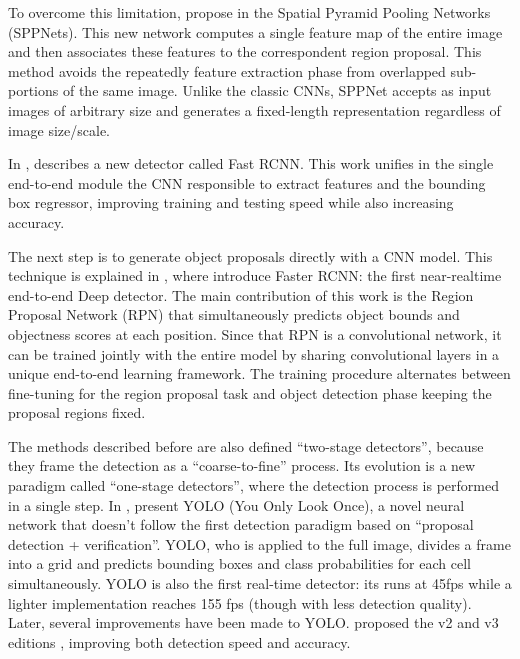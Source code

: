  To overcome this limitation, \citeauthor{sppnet} propose in \cite{sppnet} the Spatial Pyramid Pooling Networks (SPPNets). This new network computes a single feature map of the entire image and then associates these features to the correspondent region proposal. This method avoids the repeatedly feature extraction phase from overlapped sub-portions of the same image.  Unlike the classic CNNs, SPPNet accepts as input images of arbitrary size and generates a fixed-length representation regardless of image size/scale. 
 
 In \cite{fastrcnn}, \citeauthor{fastrcnn} describes a new detector called Fast RCNN. This work unifies in the single end-to-end module the CNN responsible to extract features and the bounding box regressor, improving training and testing speed while also increasing accuracy. 
 
 The next step is to generate object proposals directly with a CNN model. This technique is explained in \cite{fasterrcnn}, where \citeauthor{fasterrcnn} introduce Faster RCNN: the first near-realtime
 end-to-end Deep detector. The main contribution of this work is the Region Proposal Network (RPN) that simultaneously predicts object bounds and objectness scores at each position. Since that RPN is a convolutional network, it can be trained jointly with the entire model by sharing convolutional layers in a unique end-to-end learning framework. The training procedure alternates between fine-tuning for the region proposal task and object detection phase keeping the proposal regions fixed. 
 
 The methods described before are also defined ``two-stage detectors'', because they frame the detection as a ``coarse-to-fine'' process. Its evolution is a new paradigm called ``one-stage detectors'', where the detection process is performed in a single step.  In \cite{yolo}, \citeauthor{yolo} present YOLO (You Only Look Once), a novel neural network that doesn't follow the first detection paradigm based on ``proposal detection + verification''. YOLO, who is applied to the full image, divides a frame into a grid and predicts bounding boxes and class probabilities for each cell simultaneously. YOLO is also the first real-time detector: its runs at 45fps while a lighter implementation reaches 155 fps (though with less detection quality).  Later, several improvements have been made to YOLO. \citeauthor{yolov2}  proposed the v2 and v3 editions \cite{yolov2, yolov3}, improving both detection speed and accuracy.
 
